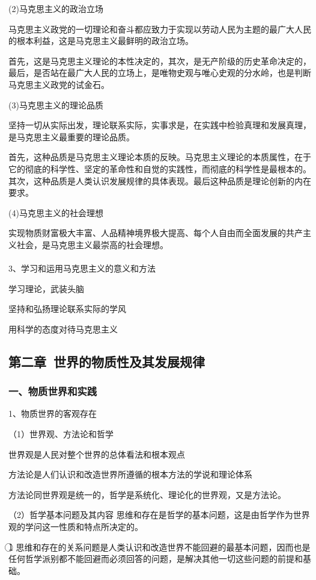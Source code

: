 \documentclass{ctexart}
\begin{document}
(2)马克思主义的政治立场

马克思主义政党的一切理论和奋斗都应致力于实现以劳动人民为主题的最广大人民的根本利益，这是马克思主义最鲜明的政治立场。


首先，这是马克思主义理论的本性决定的，其次，是无产阶级的历史革命决定的，最后，是否站在最广大人民的立场上，是唯物史观与唯心史观的分水岭，也是判断马克思主义政党的试金石。

(3)马克思主义的理论品质

坚持一切从实际出发，理论联系实际，实事求是，在实践中检验真理和发展真理，是马克思主义最重要的理论品质。

首先，这种品质是马克思主义理论本质的反映。马克思主义理论的本质属性，在于它的彻底的科学性、坚定的革命性和自觉的实践性，而彻底的科学性是最根本的。其次，这种品质是人类认识发展规律的具体表现。最后这种品质是理论创新的内在要求。

(4)马克思主义的社会理想

实现物质财富极大丰富、人品精神境界极大提高、每个人自由而全面发展的共产主义社会，是马克思主义最崇高的社会理想。
\\\\

3、学习和运用马克思主义的意义和方法

学习理论，武装头脑

坚持和弘扬理论联系实际的学风

用科学的态度对待马克思主义



\subsection{第二章\ 世界的物质性及其发展规律}
\subsubsection{一、物质世界和实践}
1、物质世界的客观存在

（1）世界观、方法论和哲学

世界观是人民对整个世界的总体看法和根本观点

方法论是人们认识和改造世界所遵循的根本方法的学说和理论体系

方法论同世界观是统一的，哲学是系统化、理论化的世界观，又是方法论。

（2）哲学基本问题及其内容
思维和存在是哲学的基本问题，这是由哲学作为世界观的学问这一性质和特点所决定的。

\textcircled{1} 思维和存在的关系问题是人类认识和改造世界不能回避的最基本问题，因而也是任何哲学派别都不能回避而必须回答的问题，是解决其他一切这些问题的前提和基础。
\end{document}
